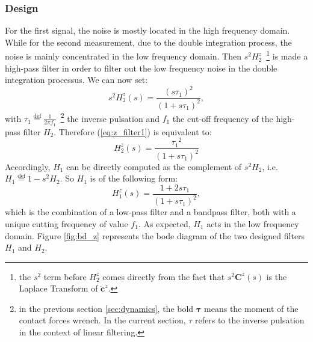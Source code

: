 \subsubsection{Design}
For the first signal, the noise is mostly located in the high frequency domain. While for the second measurement, due to the double integration process, the noise is mainly concentrated in the low frequency domain. Then $s^{2}H_{2}^z$~\footnote{the $s^{2}$ term before $H_{2}^z$ comes directly from the fact that $s^{2}\bm C^{z}(s)$ is the Laplace Transform of $\bm \ddot{c}^{z}$.}
is made a high-pass filter in order to filter out the low frequency noise in the double integration processus. We can now set:
\begin{equation}
  s^{2}H^{z}_{2} (s) = \frac{{(s\tau_{1})}^{2}}{(1+s\tau_{1})^{2}},
  \label{eq:z_filter1}
\end{equation}
with $\tau_{1} \overset{\text{def}}{=} \frac{1}{2 \pi f_{1}}$~\footnote{in the previous section \ref{sec:dynamics}, the bold $\bm \tau$ means the moment of the contact forces wrench. In the current section, $\tau$ refers to the inverse pulsation in the context of linear filtering.} the inverse pulsation and $f_{1}$ the cut-off frequency of the high-pass filter $H_{2}$. Therefore
(\ref{eq:z_filter1}) is equivalent to:
\begin{equation}
  H_{2}^{z} (s) = \frac{{\tau_{1}}^{2}}{(1+s\tau_{1})^{2}}
\end{equation}
Accordingly, $H_{1}$ can be directly computed as the complement of $s^{2}H_{2}$, i.e. $H_{1} \overset{\text{def}}{=}  1 - s^{2}H_{2}$. So $H_{1}$ is of the following form:
\begin{equation}
  H_{1}^{z} (s) = \frac{1 + 2s\tau_{1}}{(1+s\tau_{1})^{2}},
\end{equation}
which is the combination of a low-pass filter and a bandpass filter, both with a unique cutting frequency of value $f_{1}$. As expected, $H_{1}$ acts in the low frequency domain. Figure \ref{fig:bd_z} represents the bode diagram of the two designed filters $H_{1}$ and $H_{2}$.


